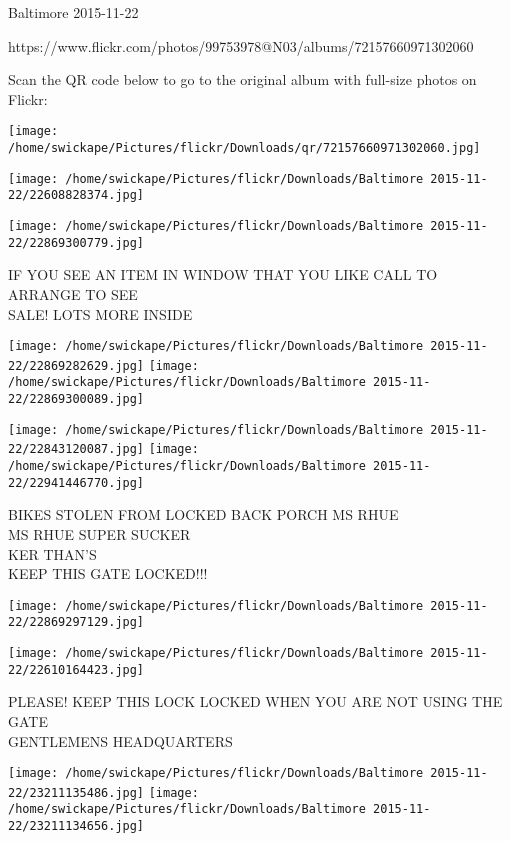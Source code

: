 \documentclass[10pt,letterpaper]{article}
\begin{document}
Baltimore 2015-11-22

https://www.flickr.com/photos/99753978@N03/albums/72157660971302060

Scan the QR code below to go to the original album with full-size photos on Flickr:

\texttt{[image: /home/swickape/Pictures/flickr/Downloads/qr/72157660971302060.jpg]}
\pagebreak

\texttt{[image: /home/swickape/Pictures/flickr/Downloads/Baltimore 2015-11-22/22608828374.jpg]}

\vspace{0.25in}
\texttt{[image: /home/swickape/Pictures/flickr/Downloads/Baltimore 2015-11-22/22869300779.jpg]}

IF YOU SEE AN ITEM IN WINDOW THAT YOU LIKE CALL TO ARRANGE TO SEE\\
SALE!  LOTS MORE INSIDE
\pagebreak

\texttt{[image: /home/swickape/Pictures/flickr/Downloads/Baltimore 2015-11-22/22869282629.jpg]}
\texttt{[image: /home/swickape/Pictures/flickr/Downloads/Baltimore 2015-11-22/22869300089.jpg]}

\texttt{[image: /home/swickape/Pictures/flickr/Downloads/Baltimore 2015-11-22/22843120087.jpg]}
\texttt{[image: /home/swickape/Pictures/flickr/Downloads/Baltimore 2015-11-22/22941446770.jpg]}

BIKES STOLEN FROM LOCKED BACK PORCH MS RHUE\\
MS RHUE SUPER SUCKER\\
KER THAN'S\\
KEEP THIS GATE LOCKED!!!
\pagebreak

\texttt{[image: /home/swickape/Pictures/flickr/Downloads/Baltimore 2015-11-22/22869297129.jpg]}

\vspace{0.25in}
\texttt{[image: /home/swickape/Pictures/flickr/Downloads/Baltimore 2015-11-22/22610164423.jpg]}

PLEASE!  KEEP THIS LOCK LOCKED WHEN YOU ARE NOT USING THE GATE\\
GENTLEMENS HEADQUARTERS
\pagebreak

\texttt{[image: /home/swickape/Pictures/flickr/Downloads/Baltimore 2015-11-22/23211135486.jpg]}
\texttt{[image: /home/swickape/Pictures/flickr/Downloads/Baltimore 2015-11-22/23211134656.jpg]}
\end{document}
